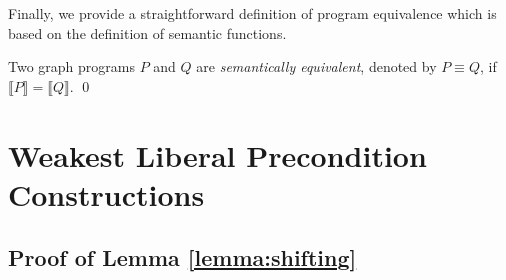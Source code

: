 \documentclass{llncs}
\begin{document}
	Finally, we provide a straightforward definition of program equivalence which is based on the definition of semantic functions.

	\begin{definition}\rm
		Two graph programs $P$ and $Q$ are \emph{semantically equivalent}, denoted by $P \equiv Q$, if $\llbracket P \rrbracket = \llbracket Q \rrbracket$.
		\qed
	\end{definition}
	
	
	











	
	
	\newpage\section{Weakest Liberal Precondition Constructions}
	
	\subsection{Proof of Lemma \ref{lemma:shifting}}\label{lemma:shifting:PROOF}
	
\end{document}

